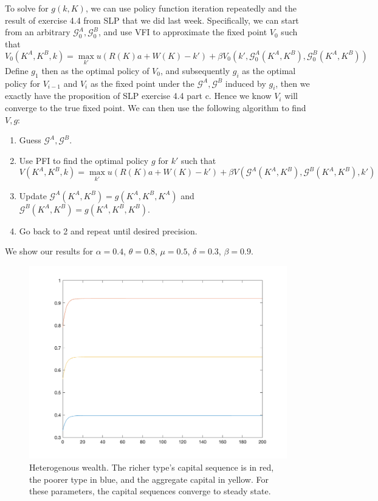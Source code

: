 \documentclass[10pt,letter]{article}
\begin{document}
To solve for $g(k, K)$, we can use policy function iteration repeatedly and the result of exercise 4.4 from SLP that we did last week. Specifically, we can start from an arbitrary $\mathcal{G}^A_0, \mathcal{G}^B_0$, and use VFI to approximate the fixed point $V_0$ such that
\[ V_0(K^A, K^B, k) = \max_{k'} u(R(K)a + W(K) - k') + \beta V_0(k', \mathcal{G}^A_0(K^A, K^B), \mathcal{G}^B_0(K^A, K^B)) \]
Define $g_1$ then as the optimal policy of $V_0$, and subsequently $g_i$ as the optimal policy for $V_{i-1}$ and $V_i$ as the fixed point under the $\mathcal{G}^A, \mathcal{G}^B$ induced by $g_i$, then we exactly have the proposition of SLP exercise 4.4 part c. Hence we know $V_i$ will converge to the true fixed point. We can then use the following algorithm to find $V, g$:
\begin{enumerate}
\item Guess $\mathcal{G}^A, \mathcal{G}^B$.
\item Use PFI to find the optimal policy $g$ for $k'$ such that
\[ V(K^A, K^B, k) = \max_{k'} u(R(K)a + W(K) - k') + \beta V(\mathcal{G}^A(K^A, K^B),\mathcal{G}^B(K^A, K^B),k') \]
\item Update $\mathcal{G}^A(K^A, K^B) = g(K^A, K^B, K^A)$ and $\mathcal{G}^B(K^A, K^B) = g(K^A, K^B, K^B)$.
\item Go back to 2 and repeat until desired precision.
\end{enumerate}

We show our results for $\alpha = 0.4$, $\theta = 0.8$, $\mu = 0.5$, $\delta=0.3$, $\beta = 0.9$.

\begin{figure}
\includegraphics[scale=0.8]{ps4q3}
\caption{Heterogenous wealth. The richer type's capital sequence is in red, the poorer type in blue, and the aggregate capital in yellow. For these parameters, the capital sequences converge to steady state.}
\end{figure}
\end{document}
